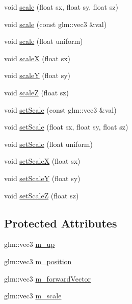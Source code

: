 \begin{DoxyCompactItemize}
void \mbox{\hyperlink{classec_1_1_transform3_d_a3f4636cea71bac0aa965bc567e649e03}{scale}} (float sx, float sy, float sz)
\item 
void \mbox{\hyperlink{classec_1_1_transform3_d_a5ddb66479416948acf2406f544aaaa0f}{scale}} (const glm\+::vec3 \&val)
\item 
void \mbox{\hyperlink{classec_1_1_transform3_d_af4798de480a697351333d068a90ab69e}{scale}} (float uniform)
\item 
void \mbox{\hyperlink{classec_1_1_transform3_d_a3b859bc4f4b47e9d4b1e322c811a9e29}{scaleX}} (float sx)
\item 
void \mbox{\hyperlink{classec_1_1_transform3_d_a2b15e39c5a79379c361fb515a163c6de}{scaleY}} (float sy)
\item 
void \mbox{\hyperlink{classec_1_1_transform3_d_a61b556423d4c5dffd55f40685b0cb777}{scaleZ}} (float sz)
\item 
void \mbox{\hyperlink{classec_1_1_transform3_d_af8c2d1832acc0b0b52e217de4efa4d91}{set\+Scale}} (const glm\+::vec3 \&val)
\item 
void \mbox{\hyperlink{classec_1_1_transform3_d_a604f8cab4d669b713e04b57a7cc57c0c}{set\+Scale}} (float sx, float sy, float sz)
\item 
void \mbox{\hyperlink{classec_1_1_transform3_d_a2bdde49d328296d1a77586ee00f4bf4e}{set\+Scale}} (float uniform)
\item 
void \mbox{\hyperlink{classec_1_1_transform3_d_ada2c6aded239ad20e1c155a5dee60506}{set\+ScaleX}} (float sx)
\item 
void \mbox{\hyperlink{classec_1_1_transform3_d_a599ea97d84a88467abec94a30339f73e}{set\+ScaleY}} (float sy)
\item 
void \mbox{\hyperlink{classec_1_1_transform3_d_a1a71c829c953e5585623696fd7a4624d}{set\+ScaleZ}} (float sz)
\end{DoxyCompactItemize}
\subsection*{Protected Attributes}
\begin{DoxyCompactItemize}
\item 
glm\+::vec3 \mbox{\hyperlink{classec_1_1_transform3_d_addd1132fb57befe841dfd9af94aa4329}{m\+\_\+up}}
\item 
glm\+::vec3 \mbox{\hyperlink{classec_1_1_transform3_d_a5bba8c29bb22d2b122b64b51b52335f7}{m\+\_\+position}}
\item 
glm\+::vec3 \mbox{\hyperlink{classec_1_1_transform3_d_a5d7ebb5dc842dc73fe0840f3e3f95ab8}{m\+\_\+forward\+Vector}}
\item 
glm\+::vec3 \mbox{\hyperlink{classec_1_1_transform3_d_a8eb8cecaa5ec8273e49c9487e0f6b935}{m\+\_\+scale}}
\end{DoxyCompactItemize}


